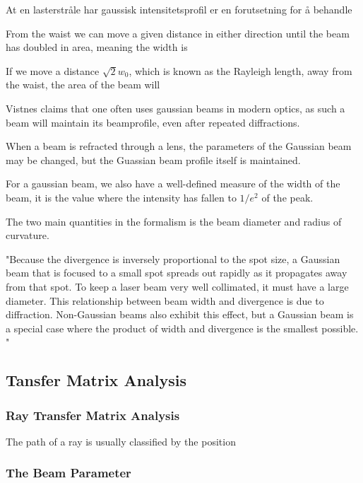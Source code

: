 \documentclass[a4paper, 11pt, notitlepage, english]{article}
\begin{document}
At en lasterstråle har gaussisk intensitetsprofil er en forutsetning for å behandle


From the waist we can move a given distance in either direction until the beam has doubled in area, meaning the width is 

If we move a distance $\sqrt{2}w_0$, which is known as the Rayleigh length, away from the waist, the area of the beam will





Vistnes claims that one often uses gaussian beams in modern optics, as such a beam will maintain its beamprofile, even after repeated diffractions.


When a beam is refracted through a lens, the parameters of the Gaussian beam may be changed, but the Guassian beam profile itself is maintained.

For a gaussian beam, we also have a well-defined measure of the width of the beam, it is the value where the intensity has fallen to $1/e^2$ of the peak.

The two main quantities in the formalism is the beam diameter and radius of curvature.

"Because the divergence is inversely proportional to the spot size, a Gaussian beam that is focused to a small spot spreads out rapidly as it propagates away from that spot. To keep a laser beam very well collimated, it must have a large diameter. This relationship between beam width and divergence is due to diffraction. Non-Gaussian beams also exhibit this effect, but a Gaussian beam is a special case where the product of width and divergence is the smallest possible.
"

\subsection{Tansfer Matrix Analysis}




\subsubsection{Ray Transfer Matrix Analysis}

The path of a ray is usually classified by the position

\subsubsection{The Beam Parameter}
\end{document}
